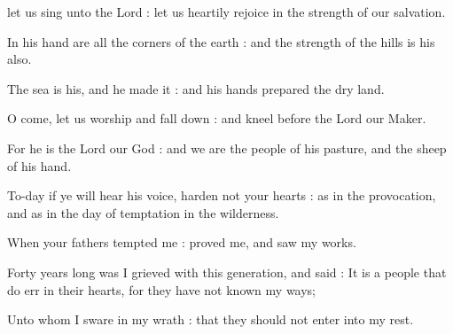

 let us sing unto the Lord : let us heartily rejoice in the strength of our salvation.\par
{}
In his hand are all the corners of the earth : and the strength of the hills is his also.\par
{}The sea is his, and he made it : and his hands prepared the dry land.\par
{}O come, let us worship and fall down : and kneel before the Lord our Maker.\par
{}For he is the Lord our God : and we are the people of his pasture, and the sheep of his hand.\par
{}To-day if ye will hear his voice, harden not your hearts : as in the provocation, and as in the day of temptation in the wilderness.\par
{}When your fathers tempted me : proved me, and saw my works.\par
{}Forty years long was I grieved with this generation, and said : It is a people that do err in their hearts, for they have not known my ways;\par
{}Unto whom I sware in my wrath : that they should not enter into my rest.\par


